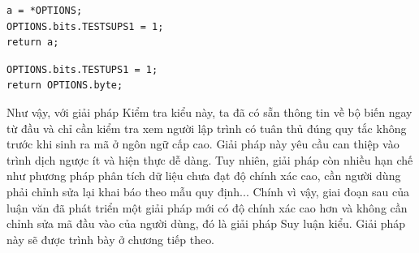 \begin{itemize}
\begin{lstlisting}[caption={Mã đầu ra trước khi thực hiện bước thay thế thanh ghi ACC},label={list:listbeforereplace}]
a = *OPTIONS;
OPTIONS.bits.TESTSUPS1 = 1;
return a;
\end{lstlisting}
\begin{lstlisting}[caption={Mã đầu ra sau khi thực hiện bước thay thế thanh ghi ACC},label={list:listafterreplace}]
OPTIONS.bits.TESTUPS1 = 1;
return OPTIONS.byte;
\end{lstlisting}
\end{itemize}


Như vậy, với giải pháp Kiểm tra kiểu này, ta đã có sẵn thông tin về bộ biến ngay từ đầu và chỉ cần kiểm tra xem người lập trình có tuân thủ đúng quy tắc không trước khi sinh ra mã ở ngôn ngữ cấp cao. Giải pháp này yêu cầu can thiệp vào trình dịch ngược ít và hiện thực dễ dàng. Tuy nhiên, giải pháp còn nhiều hạn chế như phương pháp phân tích dữ liệu chưa đạt độ chính xác cao, cần người dùng phải chỉnh sửa lại khai báo theo mẫu quy định... Chính vì vậy, giai đoạn sau của luận văn đã phát triển một giải pháp mới có độ chính xác cao hơn và không cần chỉnh sửa mã đầu vào của người dùng, đó là giải pháp Suy luận kiểu. Giải pháp này sẽ được trình bày ở chương tiếp theo.




